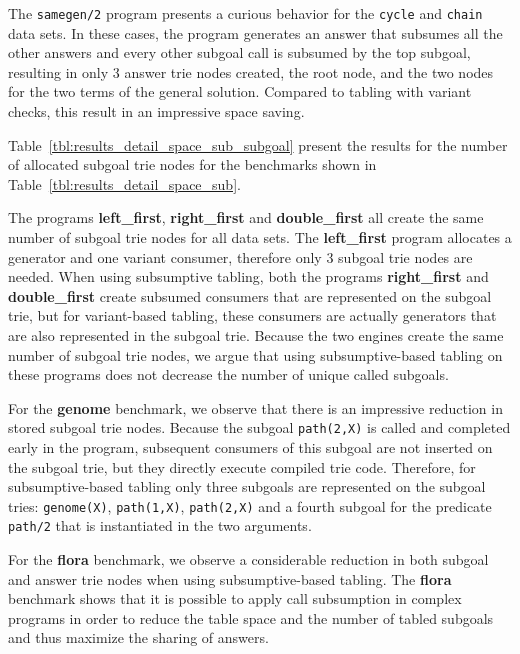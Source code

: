 

The \texttt{samegen/2} program presents a curious behavior for the \texttt{cycle} and \texttt{chain}
data sets. In these cases, the program generates an answer that subsumes all the other answers and
every other subgoal call is subsumed by the top subgoal, resulting in only 3 answer trie nodes created,
the root node, and the two nodes for the two terms of the general solution. Compared to tabling with
variant checks, this result in an impressive space saving.

Table~\ref{tbl:results_detail_space_sub_subgoal} present the results for the number of
allocated subgoal trie nodes for the benchmarks shown in Table~\ref{tbl:results_detail_space_sub}.



The programs \textbf{left\_first},
\textbf{right\_first} and \textbf{double\_first} all create the same number of subgoal trie nodes
for all data sets. The \textbf{left\_first} program allocates a generator and one variant consumer,
therefore only 3 subgoal trie nodes are needed.
When using subsumptive tabling, both the
programs \textbf{right\_first} and \textbf{double\_first} create subsumed consumers that are
represented on the subgoal trie, but for variant-based tabling, these consumers are actually
generators that are also represented in the subgoal trie. Because the two engines create the same
number of subgoal trie nodes, we argue that using subsumptive-based tabling on these programs
does not decrease the number of unique called subgoals.

For the \textbf{genome} benchmark, we observe that there is an impressive reduction in stored
subgoal trie nodes. Because the subgoal \texttt{path(2,X)} is called and completed early in the
program, subsequent consumers of this subgoal are not inserted on the subgoal trie, but they
directly execute compiled trie code. Therefore, for subsumptive-based tabling only three subgoals
are represented on the subgoal tries: \texttt{genome(X)}, \texttt{path(1,X)}, \texttt{path(2,X)}
and a fourth subgoal for the predicate \texttt{path/2} that is instantiated in the two arguments.

For the \textbf{flora} benchmark, we observe a considerable reduction in both subgoal and answer trie nodes
when using subsumptive-based tabling. The \textbf{flora} benchmark shows that it is possible to
apply call subsumption in complex programs in order to reduce the table space and the number of
tabled subgoals and thus maximize the sharing of answers.

